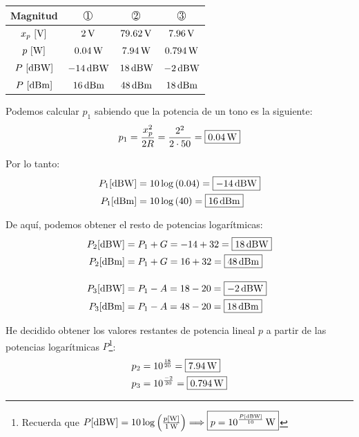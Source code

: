 \documentclass[a4paper]{book}
\begin{document}
\begingroup
\renewcommand{\arraystretch}{1.5}
\begin{center}
	\begin{tabular}{|c|c|c|c|}
		\hline
		\textbf{Magnitud} & $\circledNumber{1}$                   & $\circledNumber{2}$                   & $\circledNumber{3}$                   \\ \hline
		$x_p \ [\operatorname{V} ]$     & $2\operatorname{V}$                                 & \textcolor{green!55!black}{$79.62\operatorname{V}$} & \textcolor{green!55!black}{$7.96\operatorname{V}$}  \\ \hline
		$p \ [\operatorname{W} ]$       & \textcolor{green!55!black}{$0.04\operatorname{W}$}  & \textcolor{green!55!black}{$7.94\operatorname{W}$}  & \textcolor{green!55!black}{$0.794\operatorname{W}$} \\ \hline
		$P \ [\operatorname{dBW} ]$     & \textcolor{green!55!black}{$-14\operatorname{dBW}$} & \textcolor{green!55!black}{$18\operatorname{dBW}$}  & \textcolor{green!55!black}{$-2\operatorname{dBW}$}  \\ \hline
		$P \ [\operatorname{dBm} ]$     & \textcolor{green!55!black}{$16\operatorname{dBm}$}  & \textcolor{green!55!black}{$48\operatorname{dBm}$}  & \textcolor{green!55!black}{$18\operatorname{dBm}$}  \\ \hline
	\end{tabular}
\end{center}
\endgroup

Podemos calcular $p_1$ sabiendo que la potencia de un tono es la siguiente:
\[ p_1 = \frac{x_p^2}{2R} = \frac{2^2}{2 \cdot 50} = \boxed{0.04\operatorname{W} }\]

Por lo tanto:
\begin{align*}
	P_1 [\operatorname{dBW}] & = 10 \log \left( 0.04 \right) = \boxed{-14\operatorname{dBW}} \\
	P_1 [\operatorname{dBm}] & = 10 \log \left( 40 \right) = \boxed{16\operatorname{dBm}}
\end{align*}

De aquí, podemos obtener el resto de potencias logarítmicas:
\begin{align*}
	P_2 [\operatorname{dBW}] & = P_1 + G = -14 + 32 = \boxed{18\operatorname{dBW}} \\
	P_2 [\operatorname{dBm}] & = P_1 + G = 16 + 32  = \boxed{48\operatorname{dBm}} \\[10pt]
	P_3 [\operatorname{dBW}] & = P_1 - A = 18 - 20  = \boxed{-2\operatorname{dBW}} \\
	P_3 [\operatorname{dBm}] & = P_1 - A = 48 - 20  = \boxed{18\operatorname{dBm}}
\end{align*}

He decidido obtener los valores restantes de potencia lineal $p$ a partir de las potencias logarítmicas $P$\footnote{Recuerda que $P[\operatorname{dBW} ]=10 \log \left( \frac{p[\operatorname{W} ]}{1\operatorname{W}} \right) \Longrightarrow \boxed{p =10^{\frac{P[\operatorname{dBW} ]}{10}}\operatorname{W}}$}:
\begin{align*}
	p_2 & = 10^{\frac{18}{20}} = \boxed{7.94\operatorname{W}}  \\
	p_3 & = 10^{\frac{-2}{20}} = \boxed{0.794\operatorname{W}}
\end{align*}
\end{document}
